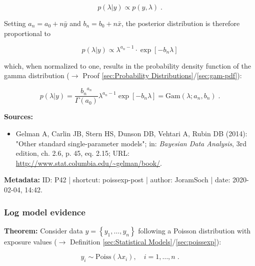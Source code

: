 \documentclass[a4paper,12pt,twoside]{book}
\begin{document}
\begin{equation} \label{eq:poissexp-post-Poiss-exp-post-s1}
p(\lambda|y) \propto p(y,\lambda) \; .
\end{equation}

Setting $a_n = a_0 + n \bar{y}$ and $b_n = b_0 + n \bar{x}$, the posterior distribution is therefore proportional to

\begin{equation} \label{eq:poissexp-post-Poiss-exp-post-s2}
p(\lambda|y) \propto \lambda^{a_n-1} \cdot \exp\left[-b_n \lambda\right]
\end{equation}

which, when normalized to one, results in the probability density function of the gamma distribution ($\rightarrow$ Proof \ref{sec:Probability Distributions}/\ref{sec:gam-pdf}):

\begin{equation} \label{eq:poissexp-post-Poiss-exp-post-s3}
p(\lambda|y) = \frac{ {b_n}^{a_n}}{\Gamma(a_0)} \lambda^{a_n-1} \exp\left[-b_n \lambda\right] = \mathrm{Gam}(\lambda; a_n, b_n) \; .
\end{equation}


\vspace{1em}
\textbf{Sources:}
\begin{itemize}
\item Gelman A, Carlin JB, Stern HS, Dunson DB, Vehtari A, Rubin DB (2014): "Other standard single-parameter models"; in: \textit{Bayesian Data Analysis}, 3rd edition, ch. 2.6, p. 45, eq. 2.15; URL: \url{http://www.stat.columbia.edu/~gelman/book/}.
\end{itemize}


\vspace{1em}
\textbf{Metadata:} ID: P42 | shortcut: poissexp-post | author: JoramSoch | date: 2020-02-04, 14:42.
\vspace{1em}



\subsubsection[\textbf{Log model evidence}]{Log model evidence} \label{sec:poissexp-lme}
\setcounter{equation}{0}

\textbf{Theorem:} Consider data $y = \left\lbrace y_1, \ldots, y_n \right\rbrace$ following a Poisson distribution with exposure values ($\rightarrow$ Definition \ref{sec:Statistical Models}/\ref{sec:poissexp}):

\begin{equation} \label{eq:poissexp-lme-Poiss-exp}
y_i \sim \mathrm{Poiss}(\lambda x_i), \quad i = 1, \ldots, n \; .
\end{equation}
\end{document}
